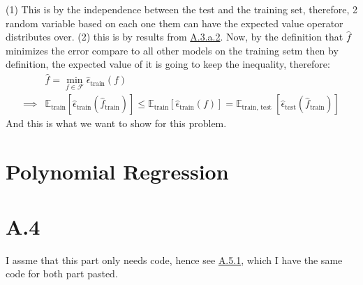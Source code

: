 \documentclass[]{article}
\begin{document}
        (1) This is by the independence between the test and the training set, therefore, 2 random variable based on each one them can have the expected value operator distributes over. (2) this is by results from \hyperref[eqn:A.3.a.2]{A.3.a.2}. Now, by the definition that $\hat{f}$ minimizes the error compare to all other models on the training setm then by definition, the expected value of it is going to keep the inequality, therefore: 
        \begin{align*}\tag{A.3.c.1}\label{eqn:A.3.c.1}
            & \hat{f} = \min_{f\in\mathcal{F}} \hat{\epsilon}_\text{train}(f)
            \\
            \implies & 
            \mathbb{E}_\text{train} 
            \left[\hat{\epsilon}_\text{train}(\hat{f}_\text{train})\right]
            \le 
            \mathbb{E}_\text{train}\left[
                \hat{\epsilon}_\text{train}(f)
            \right]
            =
            \mathbb{E}_{\text{train, test }}\left[
                \hat{\epsilon}_\text{test}
                (\hat{f}_\text{train})
            \right]
        \end{align*}
        And this is what we want to show for this problem. 
\section*{Polynomial Regression}
    \section*{A.4}
        I assme that this part only needs code, hence see \hyperref[lst:A.5.1]{A.5.1}, which I have the same code for both part pasted. 
\end{document}
